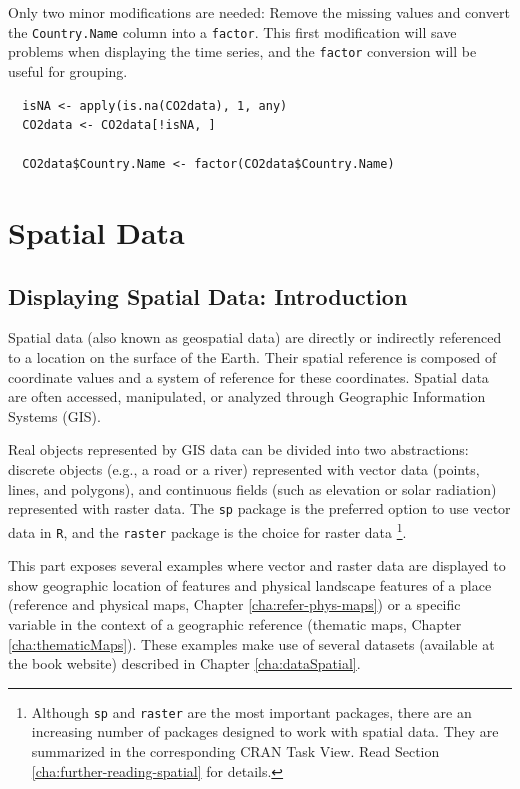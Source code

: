 \documentclass[smallroyalvopaper]{memoir}
\begin{document}
Only two minor modifications are needed: Remove the missing values and
convert the \texttt{Country.Name} column into a \texttt{factor}. This first
modification will save problems when displaying the time series, and
the \texttt{factor} conversion will be useful for grouping.
\lstset{language=r,label= ,caption= ,captionpos=b,numbers=none}
\begin{lstlisting}
  isNA <- apply(is.na(CO2data), 1, any)
  CO2data <- CO2data[!isNA, ]

  CO2data$Country.Name <- factor(CO2data$Country.Name)
\end{lstlisting}

\part{Spatial Data}
\label{sec:org8ac3895}

\chapter{Displaying Spatial Data: Introduction}
\label{sec:org5cc9888}
\label{cha:spatialIntro}

Spatial data (also known as geospatial data) are directly or indirectly referenced to a location on the surface of the Earth. Their spatial reference is composed of coordinate values and a system of reference for these coordinates. Spatial data are often accessed, manipulated, or analyzed through Geographic Information Systems (GIS).

Real objects represented by GIS data can be divided into two abstractions: discrete objects (e.g., a road or a river) represented with vector data (points, lines, and polygons), and continuous fields (such as elevation or solar radiation) represented with raster data. The \texttt{sp} package is the preferred option to use vector data in \texttt{R}, and the \texttt{raster} package is the choice for raster data \footnote{Although \texttt{sp} and \texttt{raster} are the most important packages, there are an increasing number of packages designed to work with spatial data. They are summarized in the corresponding CRAN Task View. Read Section \ref{cha:further-reading-spatial} for details.}.

This part exposes several examples where vector and raster data are displayed to show geographic location of features and physical landscape features of a place (reference and physical maps, Chapter \ref{cha:refer-phys-maps}) or a specific variable in the context of a geographic reference (thematic maps, Chapter \ref{cha:thematicMaps}). These examples make use of several datasets (available at the book website) described in Chapter \ref{cha:dataSpatial}.
\end{document}
